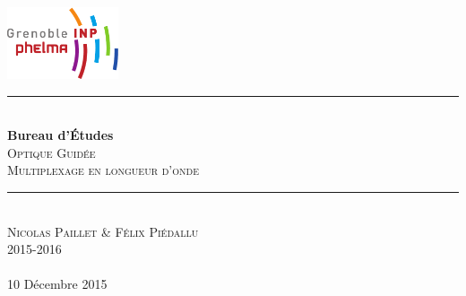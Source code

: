 \begin{titlepage}
    \vspace*{-10px}
    \includegraphics[height=80px]{logo_phelma.pdf}
    \vspace*{-80px}
\begin{flushright}
    \vspace*{60px}
\end{flushright}

\vspace*{0.5cm}
\begin{center}
\rule{\linewidth}{0.5mm}\\[0.4cm]
{\huge{\bfseries Bureau d'Études}\\[0.4cm]
\textsc{Optique Guidée}\\[0.4cm]}
{\Large \textsc{Multiplexage en longueur d'onde}}\\[0.4cm]
\rule{\linewidth}{0.5mm}\\[0.5cm]

\LARGE{\textsc{Nicolas Paillet \& Félix Piédallu}}\\[0.7cm]
\large{\textsc{2015-2016}}\\[2cm]

\Large{~}\\[1cm]

\large{10 Décembre 2015}\\[2cm]


\end{center}
\end{titlepage}

\tableofcontents        %
\newpage
{}  %

